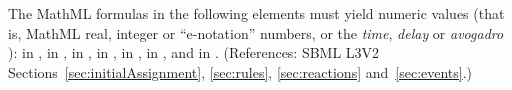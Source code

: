 The MathML formulas in the following elements must yield numeric
values (that is, MathML real, integer or ``e-notation'' numbers,
or the \emph{time}, \emph{delay} or \emph{avogadro} ):
 in \KineticLaw,  in
\InitialAssignment,  in \AssignmentRule,  in
\RateRule,  in \AlgebraicRule,  in \Event
\Delay, and  in \EventAssignment.  (References: SBML L3V2 
Sections~\ref{sec:initialAssignment}, \ref{sec:rules}, 
\ref{sec:reactions} and~\ref{sec:events}.)



